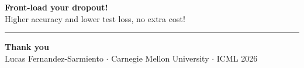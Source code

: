 \documentclass[aspectratio=169,10pt]{beamer}
\begin{document}
\begin{frame}[plain]
  \vfill
  \begin{center}
    {\fontsize{26}{31}\selectfont\color{forest}\bfseries Front-load your dropout!}\\[0.5em]
    {\fontsize{15}{20}\selectfont\color{ink}%
      Higher accuracy and lower test loss, no extra cost!}

    \vspace{0.85cm}
    {\color{gold}\rule{6.5cm}{1.0pt}}

    \vspace{1.0cm}
    {\large\color{forest}\bfseries Thank you}\\[0.25em]
    {\scriptsize\color{muted}Lucas Fernandez-Sarmiento \(\cdot\) Carnegie Mellon University \(\cdot\) ICML 2026}
  \end{center}
  \vfill
\end{frame}
\end{document}
